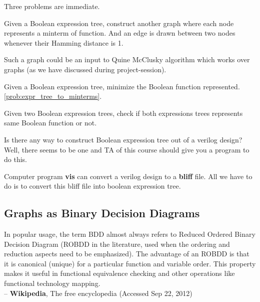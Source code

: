 Three problems are immediate.
  
  \begin{problem}[15]
  \label{prob:expr_tree_to_minterms}
  Given a Boolean expression tree, construct another graph where each node
  represents a minterm of function. And an edge is drawn between two nodes whenever
  their Hamming distance is 1.
\end{problem}

  Such a graph could be an input to Quine McClusky algorithm which works over
  graphs (as we have discussed during project-session).

  \begin{problem}[25]
  \label{prob:minimize_expression_tree}
  Given a Boolean expression tree, minimize the Boolean function represented.
  \ref{prob:expr_tree_to_minterms}.   
  
  \end{problem}

  \begin{problem}[45]
  \label{prob:equivalence_checking}
  Given two Boolean expression trees, check if both expressions trees represents
  same Boolean function or not.
  \end{problem}


  \begin{remark}

    Is there any way to construct Boolean expression tree out of a verilog
    design? Well, there seems to be one and TA of this course should give you a
    program to do this.

    Computer program \textbf{vis} can convert a verilog design to a
    \textbf{bliff} file. All we have to do is to convert this bliff file into
    boolean expression tree. 
  
  \end{remark}


\newpage
\subsection{Graphs as Binary Decision Diagrams}

\begin{flushright}

In popular usage, the term BDD almost always refers to Reduced Ordered Binary
Decision Diagram (ROBDD in the literature, used when the ordering and reduction
aspects need to be emphasized). The advantage of an ROBDD is that it is
canonical (unique) for a particular function and variable order. This
property makes it useful in functional equivalence checking and other operations
like functional technology mapping. \\
-- \textbf{Wikipedia}, The free encyclopedia (Accessed Sep 22, 2012) 

\end{flushright}

